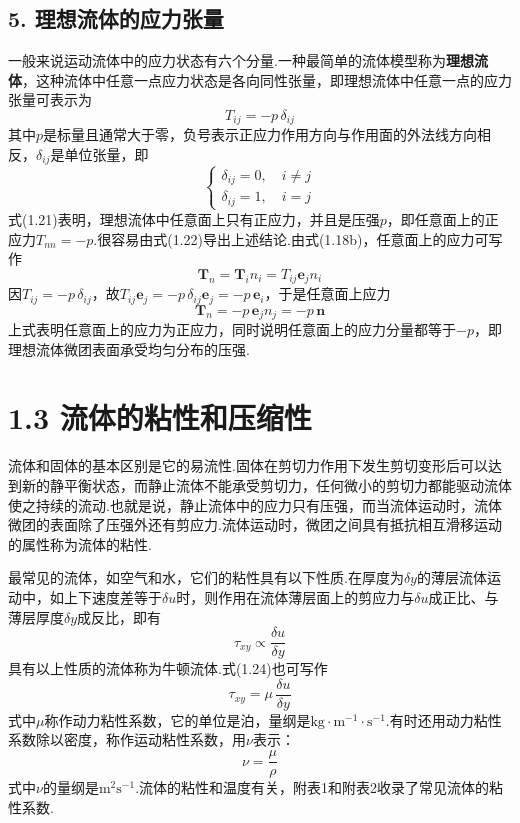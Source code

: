 \subsection*{5. 理想流体的应力张量}

一般来说运动流体中的应力状态有六个分量.一种最简单的流体模型称为\textbf{理想流体}，这种流体中任意一点应力状态是各向同性张量，即理想流体中任意一点的应力张量可表示为
\begin{equation*}
T_{ij}=-p\,\delta_{ij}
\tag{1.21}
\end{equation*}
其中$p$是标量且通常大于零，负号表示正应力作用方向与作用面的外法线方向相反，$\delta_{ij}$是单位张量，即
\begin{equation*}
\begin{cases}
\delta_{ij}=0,\quad i\neq j\\[2pt]
\delta_{ij}=1,\quad i=j
\end{cases}
\tag{1.22}
\end{equation*}
式(1.21)表明，理想流体中任意面上只有正应力，并且是压强$p$，即任意面上的正应力$T_{nn}=-p$.很容易由式(1.22)导出上述结论.由式(1.18b)，任意面上的应力可写作
\[
\boldsymbol{T}_n=\boldsymbol{T}_i n_i=T_{ij}\boldsymbol{e}_j n_i
\]
因$T_{ij}=-p\,\delta_{ij}$，故$T_{ij}\boldsymbol{e}_j=-p\,\delta_{ij}\boldsymbol{e}_j=-p\,\boldsymbol{e}_i$，于是任意面上应力
\begin{equation*}
\boldsymbol{T}_n=-p\,\boldsymbol{e}_j n_j=-p\,\boldsymbol{n}
\tag{1.23}
\end{equation*}
上式表明任意面上的应力为正应力，同时说明任意面上的应力分量都等于$-p$，即理想流体微团表面承受均匀分布的压强.

\section*{1.3  流体的粘性和压缩性}

流体和固体的基本区别是它的易流性.固体在剪切力作用下发生剪切变形后可以达到新的静平衡状态，而静止流体不能承受剪切力，任何微小的剪切力都能驱动流体使之持续的流动.也就是说，静止流体中的应力只有压强，而当流体运动时，流体微团的表面除了压强外还有剪应力.流体运动时，微团之间具有抵抗相互滑移运动的属性称为流体的粘性.

最常见的流体，如空气和水，它们的粘性具有以下性质.在厚度为$\delta y$的薄层流体运动中，如上下速度差等于$\delta u$时，则作用在流体薄层面上的剪应力与$\delta u$成正比、与薄层厚度$\delta y$成反比，即有
\begin{equation*}
\tau_{xy}\propto\frac{\delta u}{\delta y}
\tag{1.24}
\end{equation*}
具有以上性质的流体称为牛顿流体.式(1.24)也可写作
\begin{equation*}
\tau_{xy}=\mu\,\frac{\delta u}{\delta y}
\tag{1.25}
\end{equation*}
式中$\mu$称作动力粘性系数，它的单位是泊，量纲是$\mathrm{kg\cdot m^{-1}\cdot s^{-1}}$.有时还用动力粘性系数除以密度，称作运动粘性系数，用$\nu$表示：
\begin{equation*}
\nu=\frac{\mu}{\rho}
\tag{1.26}
\end{equation*}
式中$\nu$的量纲是$\mathrm{m^{2}s^{-1}}$.流体的粘性和温度有关，附表1和附表2收录了常见流体的粘性系数.

